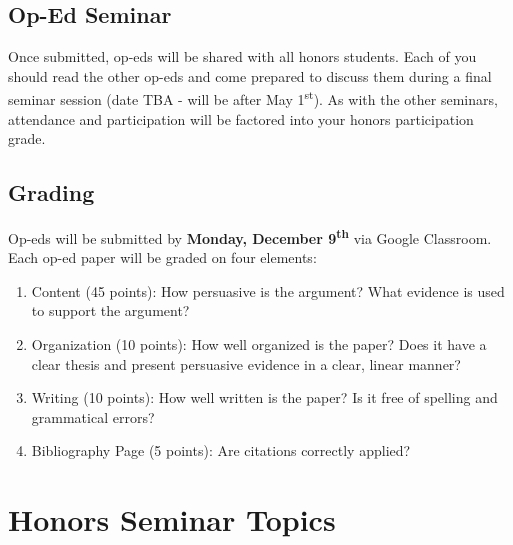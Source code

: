 \documentclass[]{book}
\providecommand{\tightlist}{%
  \setlength{\itemsep}{0pt}\setlength{\parskip}{0pt}}
\begin{document}
\hypertarget{op-ed-seminar}{%
\subsection{Op-Ed Seminar}\label{op-ed-seminar}}

Once submitted, op-eds will be shared with all honors students. Each of you should read the other op-eds and come prepared to discuss them during a final seminar session (date TBA - will be after May 1\textsuperscript{st}). As with the other seminars, attendance and participation will be factored into your honors participation grade.

\hypertarget{grading-2}{%
\subsection{Grading}\label{grading-2}}

Op-eds will be submitted by \textbf{Monday, December 9\textsuperscript{th}} via Google Classroom. Each op-ed paper will be graded on four elements:

\begin{enumerate}
\def\labelenumi{\arabic{enumi}.}
\tightlist
\item
  Content (45 points): How persuasive is the argument? What evidence is used to support the argument?
\item
  Organization (10 points): How well organized is the paper? Does it
  have a clear thesis and present persuasive evidence in a clear, linear manner?
\item
  Writing (10 points): How well written is the paper? Is it free of
  spelling and grammatical errors?
\item
  Bibliography Page (5 points): Are citations correctly applied?
\end{enumerate}

\hypertarget{honors-seminar-topics}{%
\section{Honors Seminar Topics}\label{honors-seminar-topics}}
\end{document}
